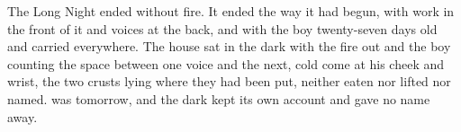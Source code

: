 The Long Night ended without fire. It ended the way it had begun, with work in the front of it and voices at the back, and with the boy twenty-seven days old and carried everywhere. The house sat in the dark with the fire out and the boy counting the space between one voice and the next, cold come at his cheek and wrist, the two crusts lying where they had been put, neither eaten nor lifted nor named.  was tomorrow, and the dark kept its own account and gave no name away.

